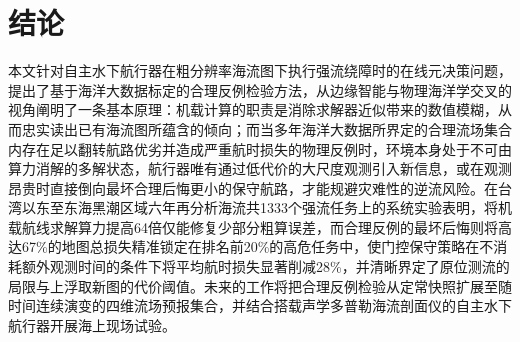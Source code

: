 \section{结论}

本文针对自主水下航行器在粗分辨率海流图下执行强流绕障时的在线元决策问题，提出了基于海洋大数据标定的合理反例检验方法，从边缘智能与物理海洋学交叉的视角阐明了一条基本原理：机载计算的职责是消除求解器近似带来的数值模糊，从而忠实读出已有海流图所蕴含的倾向；而当多年海洋大数据所界定的合理流场集合内存在足以翻转航路优劣并造成严重航时损失的物理反例时，环境本身处于不可由算力消解的多解状态，航行器唯有通过低代价的大尺度观测引入新信息，或在观测昂贵时直接倒向最坏合理后悔更小的保守航路，才能规避灾难性的逆流风险。在台湾以东至东海黑潮区域六年再分析海流共1333个强流任务上的系统实验表明，将机载航线求解算力提高64倍仅能修复少部分粗算误差，而合理反例的最坏后悔则将高达67\%的地图总损失精准锁定在排名前20\%的高危任务中，使门控保守策略在不消耗额外观测时间的条件下将平均航时损失显著削减28\%，并清晰界定了原位测流的局限与上浮取新图的代价阈值。未来的工作将把合理反例检验从定常快照扩展至随时间连续演变的四维流场预报集合，并结合搭载声学多普勒海流剖面仪的自主水下航行器开展海上现场试验。
